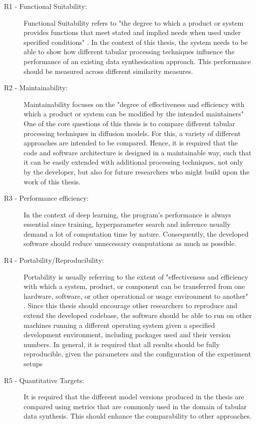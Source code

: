 \begin{description}
    \item[R1 - Functional Suitability:]
    Functional Suitability refers to "the degree to which a product or system provides functions that meet stated and implied needs when used under specified conditions" \cite[p. 219]{bass2013SoftwareArchitecturePractice}.
    In the context of this thesis, the system needs to be able to show how different tabular processing techniques influence the performance of an existing data synthesisation approach.
    This performance should be measured across different similarity measures.

    \item[R2 - Maintainability:]
    Maintainability focuses on the "degree of effectiveness and efficiency with which a product or system can be modified by the intended maintainers" \cite[p. 220]{bass2013SoftwareArchitecturePractice}
    One of the core questions of this thesis is to compare different tabular processing techniques in diffusion models.
    For this, a variety of different approaches are intended to be compared.
    Hence, it is required that the code and software architecture is designed in a maintainable way, such that it can be easily extended with additional processing techniques, not only by the developer, 
    but also for future researchers who might build upon the work of this thesis.

    \item[R3 - Performance efficiency:]
    In the context of deep learning, the program's performance is always essential since training, hyperparameter search and inference usually demand a lot of computation time by nature.
    Consequently, the developed software should reduce unnecessary computations as much as possible.

    \item[R4 - Portability/Reproducibility:]
    Portability is usually referring to the extent of "effectiveness and efficiency with which a system, product, or component can be transferred from one hardware, software, 
    or other operational or usage environment to another" \cite[p. 220]{bass2013SoftwareArchitecturePractice}.
    Since this thesis should encourage other researchers to reproduce and extend the developed codebase, the software should be able to run on other machines running a different operating system given a specified development environment,
    including packages used and their version numbers.
    In general, it is required that all results should be fully reproducible, given the parameters and the configuration of the experiment setups

    \item[R5 - Quantitative Targets:]
    It is required that the different model versions produced in the thesis are compared using metrics that are commonly used in the domain of tabular data synthesis.
    This should enhance the comparability to other approaches.
\end{description}


